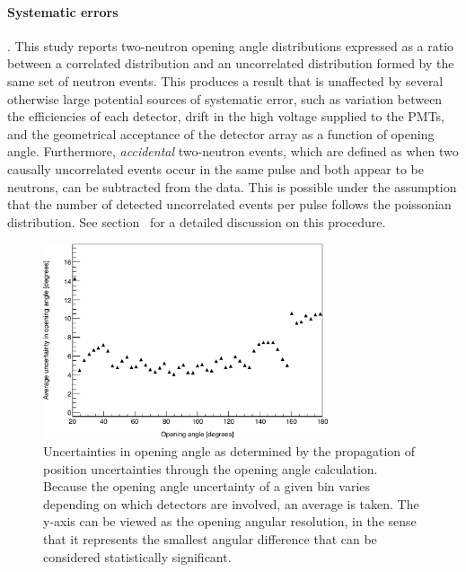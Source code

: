 \paragraph{Systematic errors}.
This study reports two-neutron opening angle distributions expressed as a ratio between a correlated distribution and an uncorrelated distribution formed by the same set of neutron events.
This produces a result that is unaffected by several otherwise large potential sources of systematic error, such as variation between the efficiencies of each detector, drift in the high voltage supplied to the PMTs, and the geometrical acceptance of the detector array as a function of opening angle.
Furthermore, \textit{accidental} two-neutron events, which are defined as when two causally uncorrelated events occur in the same pulse and both appear to be neutrons, can be subtracted from the data.
This is possible under the assumption that the number of detected uncorrelated events per pulse follows the poissonian distribution.
See section~\label{Analysis} for a detailed discussion on this procedure.
\begin{figure}[h]
    \centering
    \includegraphics[width = 0.75\textwidth]{Content/Methods/OpeningAngleUncertainty.png}
    \caption{Uncertainties in opening angle as determined by the propagation of position uncertainties through the  opening angle calculation.
    Because the opening angle uncertainty of a given bin varies depending on which detectors are involved, an average is taken.
    The y-axis can be viewed as the opening angular resolution, in the sense that it represents the smallest angular difference that can be considered statistically significant.
    }
    \label{fig:CrossTalkExamplepng}
\end{figure}


